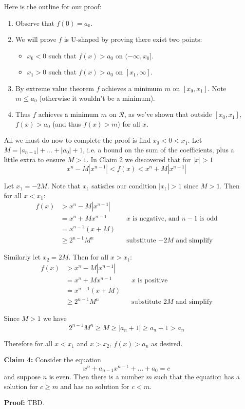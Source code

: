 \vs

Here is the outline for our proof:

\begin{enumerate}
\item Observe that $f(0)=a_0$.
\item We will prove $f$ is U-shaped by proving there exist two points:
  \begin{itemize}
  \item $x_0<0$ such that $f(x)>a_0$ on $(-\infty, x_0]$.
  \item $x_1>0$ such that $f(x)>a_0$ on $[x_1, \infty]$.
  \end{itemize}
\item By extreme value theorem $f$ achieves a minimum $m$ on
  $[x_0, x_1]$. Note $m\leq a_{0}$ (otherwise it wouldn't be a minimum).
\item Thus $f$ achieves a minimum $m$ on $\mathcal{R}$, as we've shown that
  outside $[x_0, x_1]$, $f(x)>a_{0}$ (and thus $f(x)>m$) for all $x$.
\end{enumerate}

All we must do now to complete the proof is find $x_0<0<x_1$. Let
$M=|a_{n-1}|+\ldots+|a_0|+1$, i.e. a bound on the sum of the coefficients,
plus a little extra to ensure $M>1$. In Claim 2 we discovered that for
$|x|>1$
\[x^{n}-M|x^{n-1}|<f(x)<x^{n}+M|x^{n-1}|\]

Let $x_1=-2M$. Note that $x_1$ satisfies our condition $|x_1|>1$ since
$M>1$. Then for all $x<x_1$:
\begin{align*}
  f(x)&>x^{n}-M|x^{n-1}|\\
      &=x^n+Mx^{n-1}&&\text{$x$ is negative, and $n-1$ is odd}\\
      &=x^{n-1}(x+M)\\
      &\geq 2^{n-1}M^n&&\text{substitute $-2M$ and simplify}
\end{align*}

Similarly let $x_2=2M$. Then for all $x>x_1$:
\begin{align*}
  f(x)&>x^{n}-M|x^{n-1}|\\
      &=x^n+Mx^{n-1}&&\text{$x$ is positive}\\
      &=x^{n-1}(x+M)\\
      &\geq 2^{n-1}M^n&&\text{substitute $2M$ and simplify}
\end{align*}

Since $M>1$ we have
\[2^{n-1}M^n\geq M\geq |a_n+1|\geq a_n+1>a_n\]

Therefore for all $x<x_1$ and $x>x_2$, $f(x)>a_{n}$ as desired.

\vs

\textbf{Claim 4:} Consider the equation
\[x^{n}+a_{n-1}x^{n-1}+\ldots+a_{0}=c\]
and suppose $n$ is even. Then there is a number $m$ such that the
equation has a solution for $c\geq m$ and has no solution for $c<m$.

\vs

\textbf{Proof:} TBD.

\vs



